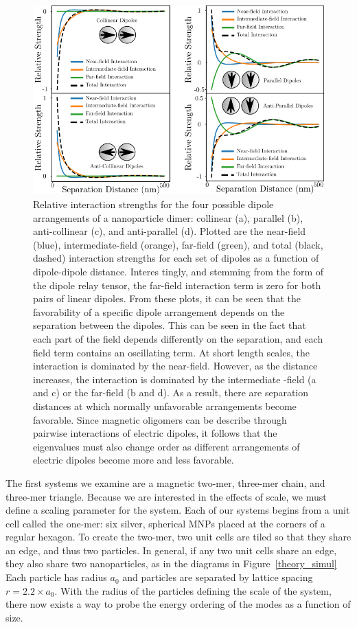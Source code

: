 \documentclass[journal=apchd5,manuscript=article]{achemso}
\begin{document}
\begin{figure}
\centering
\includegraphics[width=0.65\paperwidth]{dimer_interaction.png}
\caption{Relative interaction strengths for the four possible dipole arrangements of a nanoparticle dimer: collinear (a), parallel (b), anti-collinear (c), and anti-parallel (d). Plotted are 
the near-field (blue), intermediate-field (orange), far-field (green), and total (black, dashed) interaction strengths for each set of dipoles as a function of dipole-dipole distance. Interes
tingly, and stemming from the form of the dipole relay tensor, the far-field interaction term is zero for both pairs of linear dipoles. From these plots, it can be seen that the favorability 
of a specific dipole arrangement depends on the separation between the dipoles. This can be seen in the fact that each part of the field depends differently on the separation, and each field 
term contains an oscillating term. At short length scales, the interaction is dominated by the near-field. However, as the distance increases, the interaction is dominated by the intermediate
-field (a and c) or the far-field (b and d). As a result, there are separation distances at which normally unfavorable arrangements become favorable. Since magnetic oligomers can be describe through pairwise interactions of electric dipoles, it follows that the eigenvalues must also change order as different arrangements of electric dipoles become more and less favorable.}
\label{fig:dimers}
\end{figure}

The first systems we examine are a magnetic two-mer\cite{Cherqui2014}, three-mer chain, and three-mer triangle. Because we are interested in the effects of scale, we must define a scaling parameter for the system. Each of our systems begins from a unit cell called the one-mer: six silver, spherical MNPs placed at the corners of a regular hexagon. To create the two-mer, two unit cells are tiled so that they share an edge, and thus two particles. In general, if any two unit cells share an edge, they also share two nanoparticles, as in the diagrams in Figure~\ref{theory_simul} Each particle has radius $a_0$ and particles are separated by lattice spacing $r=2.2\times a_0$. With the radius of the particles defining the scale of the system, there now exists a way to probe the energy ordering of the modes as a function of size.
\end{document}
